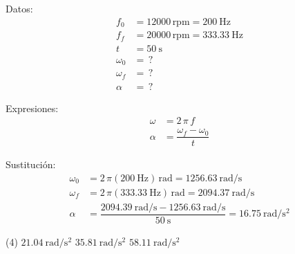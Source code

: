 \documentclass[12pt, letter]{exam}
\begin{document}
\begin{questions}
    \begin{minipage}[t]{0.4\linewidth}
    Datos: 
    \begin{align*}
    f_{0} &= 12000 \, \text{rpm} = \SI{200}{\hertz} \\
    f_{f} &= 20000 \, \text{rpm} = \SI{333.33}{\hertz} \\
    t &= \SI{50}{\second} \\
    \omega_{0} &= \, ? \\
    \omega_{f} &= \, ? \\
    \alpha &= \, ?
    \end{align*}
    \end{minipage}
    \hspace{1cm}
    \begin{minipage}[t]{0.4\linewidth}
    Expresiones:
    \begin{align*}
    \omega &= 2 \, \pi \, f \\
    \alpha &= \dfrac{\omega_{f} - \omega_{0}}{t}
    \end{align*}
    \end{minipage}

    Sustitución:
    \begin{align*}
    \omega_{0} &= 2 \, \pi (\SI{200}{\hertz}) \, \unit{\radian} = \SI[per-mode=fraction]{1256.63}{\radian\per\second} \\[0.5em]
    \omega_{f} &= 2 \, \pi (\SI{333.33}{\hertz}) \, \unit{\radian} = \SI[per-mode=fraction]{2094.37}{\radian\per\second} \\[0.5em]
    \alpha &= \dfrac{ \displaystyle \SI[per-mode=fraction]{2094.39}{\radian\per\second} - \SI[per-mode=fraction]{1256.63}{\radian\per\second} }{\SI{50}{\second}} = \SI[per-mode=fraction]{16.75}{\radian\per\square\second}
    \end{align*}

    \vspace{0.3cm}
    \begin{tasks}(4)
        \task {}
        \task $\displaystyle \SI[per-mode=fraction]{21.04}{\radian\per\square\second}$
        \task $\displaystyle \SI[per-mode=fraction]{35.81}{\radian\per\square\second}$
        \task $\displaystyle \SI[per-mode=fraction]{58.11}{\radian\per\square\second}$
    \end{tasks}


\end{questions}
\end{document}
